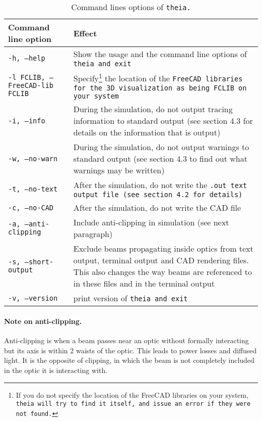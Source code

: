 \documentclass{article}
\begin{document}
\begin{table}[h]
\begin{center}
\begin{tabular}{| p{4cm} | p{10cm} |}
\hline
\textbf{Command line option} & \textbf{Effect} \\
\hline \hline
\tt{-h, --help} & Show the usage and the command line options of \tt{theia} and exit\\
\hline
\tt{-l FCLIB, --FreeCAD-lib FCLIB} & Specify\footnote{If you do not specify the location of the FreeCAD libraries on your system, \tt{theia} will try to find it itself, and issue an error if they were not found.} the location of the \tt{FreeCAD} libraries for the 3D visualization as being \tt{FCLIB} on your system\\
\hline
\tt{-i, --info} & During the simulation, do not output tracing information to standard output (see section 4.3 for details on the information that is output)\\
\hline
\tt{-w, --no-warn} & During the simulation, do not output warnings to standard output (see section 4.3 to find out what warnings may be written)\\
\hline
\tt{-t, --no-text} & After the simulation, do not write the \tt{.out} text output file (see section 4.2 for details)\\
\hline
\tt{-c, --no-CAD} & After the simulation, do not write the CAD file\\
\hline
\tt{-a, --anti-clipping} & Include anti-clipping in simulation (see next paragraph) \\
\hline
\tt{-s, --short-output} & Exclude beams propagating inside optics from text output, terminal output and CAD rendering files. This also changes the way beams are referenced to in these files and in the terminal output\\
\hline
\tt{-v, --version} & print version of \tt{theia} and exit\\
\hline
\end{tabular}
\end{center}
\caption{Command lines options of \tt{theia}.}
\label{option}
\end{table}

\paragraph{Note on anti-clipping.}Anti-clipping is when a beam passes near an optic without formally interacting but its axis is within 2 waists of the optic. This leads to power losses and diffused light. It is the opposite of clipping, in which the beam is not completely included in the optic it is interacting with.
\end{document}
